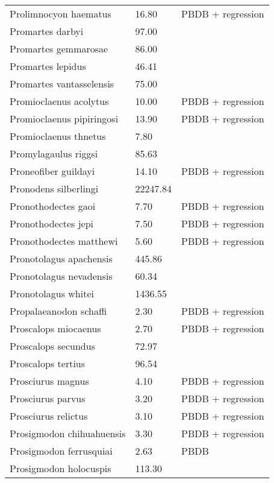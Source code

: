 \begin{longtable}{p{} p{} p{}}
    Prolimnocyon haematus & 16.80 & PBDB + regression \\ 
    Promartes darbyi & 97.00 & \cite{Dawson2007} \\ 
    Promartes gemmarosae & 86.00 & \cite{Dawson2007} \\ 
    Promartes lepidus & 46.41 & \cite{Mora2005} \\ 
    Promartes vantasselensis & 75.00 & \cite{Dawson2007} \\ 
    Promioclaenus acolytus & 10.00 & PBDB + regression \\ 
    Promioclaenus pipiringosi & 13.90 & PBDB + regression \\ 
    Promioclaenus thnetus & 7.80 & \cite{Gazin1930} \\ 
    Promylagaulus riggsi & 85.63 & \cite{Tomiya2013} \\ 
    Proneofiber guildayi & 14.10 & PBDB + regression \\ 
    Pronodens silberlingi & 22247.84 & \cite{Tomiya2013} \\ 
    Pronothodectes gaoi & 7.70 & PBDB + regression \\ 
    Pronothodectes jepi & 7.50 & PBDB + regression \\ 
    Pronothodectes matthewi & 5.60 & PBDB + regression \\ 
    Pronotolagus apachensis & 445.86 & \cite{Tomiya2013} \\ 
    Pronotolagus nevadensis & 60.34 & \cite{Tomiya2013} \\ 
    Pronotolagus whitei & 1436.55 & \cite{Tomiya2013} \\ 
    Propalaeanodon schaffi & 2.30 & PBDB + regression \\ 
    Proscalops miocaenus & 2.70 & PBDB + regression \\ 
    Proscalops secundus & 72.97 & \cite{Tomiya2013} \\ 
    Proscalops tertius & 96.54 & \cite{Tomiya2013} \\ 
    Prosciurus magnus & 4.10 & PBDB + regression \\ 
    Prosciurus parvus & 3.20 & PBDB + regression \\ 
    Prosciurus relictus & 3.10 & PBDB + regression \\ 
    Prosigmodon chihuahuensis & 3.30 & PBDB + regression \\ 
    Prosigmodon ferrusquiai & 2.63 & PBDB \\ 
    Prosigmodon holocuspis & 113.30 & \cite{Tomiya2013} \\ 

\end{longtable}
